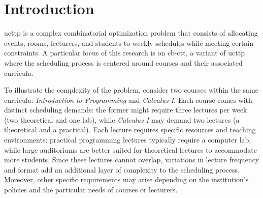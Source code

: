 
\chapter{Introduction}


\label{Introduction}


\ac{ucttp} is a complex combinatorial optimization problem that consists of allocating events, rooms, lecturers, and students to weekly schedules while meeting certain constraints. A particular focus of this research is on \ac{cb-ctt}, a variant of \ac{ucttp} where the scheduling process is centered around courses and their associated curricula. 

To illustrate the complexity of the problem, consider two courses within the same curricula: \textit{Introduction to Programming} and \textit{Calculus I}. Each course comes with distinct scheduling demands: the former might require three lectures per week (two theoretical and one lab), while \textit{Calculus I} may demand two lectures (a theoretical and a practical). Each lecture requires specific resources and teaching environments: practical programming lectures typically require a computer lab, while large auditoriums are better suited for theoretical lectures to accommodate more students. Since these lectures cannot overlap, variations in lecture frequency and format add an additional layer of complexity to the scheduling process. %
Moreover, other specific requirements may arise depending on the institution’s policies and the particular needs of courses or lecturers.

